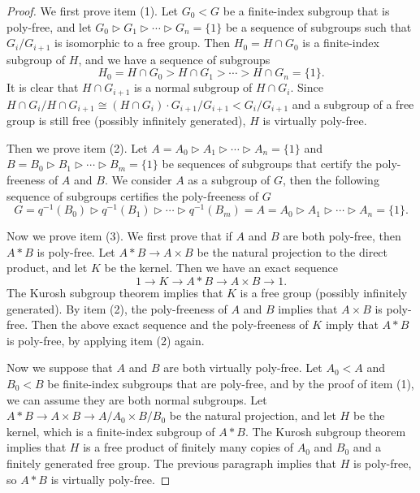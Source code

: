 \documentclass{amsart}
\numberwithin{equation}{section}
\theoremstyle{definition}
\begin{document}
\begin{proof}
We first prove item (1). Let $G_0<G$ be a finite-index subgroup that is poly-free, and let $G_0\vartriangleright G_1 \vartriangleright \cdots \vartriangleright G_n=\{1\}$ be a sequence of subgroups such that $G_i/G_{i+1}$ is isomorphic to a free group. Then $H_0=H\cap G_0$ is a finite-index subgroup of $H$, and we have a sequence of subgroups
$$H_0=H\cap G_0> H\cap G_1 >\cdots > H\cap G_n=\{1\}.$$ 
It is clear that $H\cap G_{i+1}$ is a normal subgroup of $H\cap G_i$.
Since $H\cap G_i/H\cap G_{i+1}\cong (H\cap G_i)\cdot G_{i+1}/G_{i+1}<G_i/G_{i+1}$ and a subgroup of a free group is still free (possibly infinitely generated), $H$ is virtually poly-free.

Then we prove item (2). Let $A=A_0\vartriangleright A_1\vartriangleright\cdots \vartriangleright A_n=\{1\}$ and  $B=B_0\vartriangleright B_1\vartriangleright\cdots \vartriangleright B_m=\{1\}$ be sequences of subgroups that certify the poly-freeness of $A$ and $B$. We consider $A$ as a subgroup of $G$, then the following sequence of subgroups certifies the poly-freeness of $G$
$$G=q^{-1}(B_0)\vartriangleright q^{-1}(B_1) \vartriangleright \cdots \vartriangleright q^{-1}(B_m)=A=A_0 \vartriangleright A_1 \vartriangleright \cdots \vartriangleright A_n=\{1\}.$$

Now we prove item (3). We first prove that if $A$ and $B$ are both poly-free, then $A*B$ is poly-free. Let $A*B\to A\times B$ be the natural projection to the direct product, and let $K$ be the kernel. Then we have an exact sequence
$$1\to K\to A*B\to A\times B\to 1.$$ 
The Kurosh subgroup theorem implies that $K$ is a free group (possibly infinitely generated). By item (2), the poly-freeness of $A$ and $B$ implies that $A\times B$ is poly-free. Then the above exact sequence and the poly-freeness of $K$ imply that $A*B$ is poly-free, by applying item (2) again.

Now we suppose that $A$ and $B$ are both virtually poly-free. Let $A_0<A$ and $B_0<B$ be finite-index subgroups that are poly-free, and by the proof of item (1), we can assume they are both normal subgroups. Let $A*B\to A\times B\to A/A_0\times B/B_0$ be the natural projection, and let $H$ be the kernel, which is a finite-index subgroup of $A*B$. The Kurosh subgroup theorem implies that $H$ is a free product of finitely many copies of $A_0$ and $B_0$ and a finitely generated free group. The previous paragraph implies that $H$ is poly-free, so $A*B$ is virtually poly-free.
\end{proof}
\end{document}
